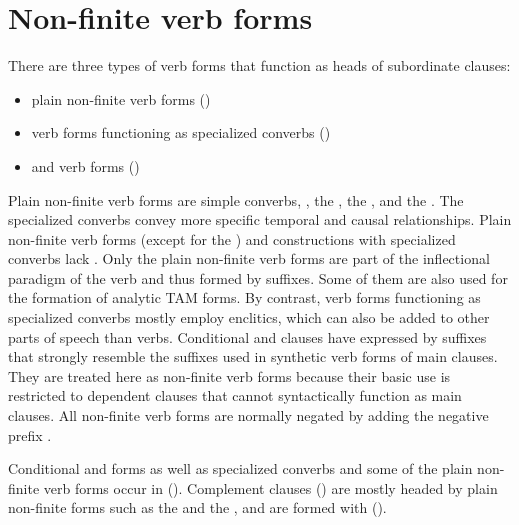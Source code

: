 \chapter{Non-finite verb forms}
\label{cpt:nonfiniteverbforms}

There are three types of verb forms that function as heads of subordinate clauses:
%
\begin{itemize}
	\item	plain non-finite verb forms ()
	\item	verb forms functioning as specialized converbs ()
		\item	{} and  verb forms ()
\end{itemize}

Plain non-finite verb forms are simple converbs, , the , the , and the . The specialized converbs convey more specific temporal and causal relationships. Plain non-finite verb forms (except for the ) and constructions with specialized converbs lack . Only the plain non-finite verb forms are part of the inflectional paradigm of the verb and thus formed by suffixes. Some of them are also used for the formation of analytic TAM forms. By contrast, verb forms functioning as specialized converbs mostly employ enclitics, which can also be added to other parts of speech than verbs. Conditional and  clauses have  expressed by suffixes that strongly resemble the suffixes used in synthetic verb forms of main clauses. They are treated here as non-finite verb forms because their basic use is restricted to dependent clauses that cannot syntactically function as  main clauses. All non-finite verb forms are normally negated by adding the negative prefix .

Conditional and  forms as well as specialized converbs and some of the plain non-finite verb forms occur in  (). Complement clauses () are mostly headed by plain non-finite forms such as the  and the , and  are formed with  (). 



